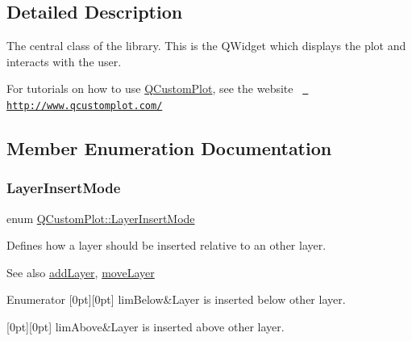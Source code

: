 \subsection{Detailed Description}
The central class of the library. This is the Q\+Widget which displays the plot and interacts with the user. 

For tutorials on how to use \mbox{\hyperlink{class_q_custom_plot}{Q\+Custom\+Plot}}, see the website~\newline
\href{http://www.qcustomplot.com/}{\texttt{ http\+://www.\+qcustomplot.\+com/}} 

\subsection{Member Enumeration Documentation}
\mbox{\label{class_q_custom_plot_a75a8afbe6ef333b1f3d47abb25b9add7}} 
\subsubsection{\texorpdfstring{LayerInsertMode}{LayerInsertMode}}
{\footnotesize\ttfamily enum \mbox{\hyperlink{class_q_custom_plot_a75a8afbe6ef333b1f3d47abb25b9add7}{Q\+Custom\+Plot\+::\+Layer\+Insert\+Mode}}}

Defines how a layer should be inserted relative to an other layer.

\begin{DoxySeeAlso}{See also}
\mbox{\hyperlink{class_q_custom_plot_ad5255393df078448bb6ac83fa5db5f52}{add\+Layer}}, \mbox{\hyperlink{class_q_custom_plot_ae896140beff19424e9e9e02d6e331104}{move\+Layer}} 
\end{DoxySeeAlso}
\begin{DoxyEnumFields}{Enumerator}
[0pt][0pt]{}\mbox{\label{class_q_custom_plot_a75a8afbe6ef333b1f3d47abb25b9add7aee39cf650cd24e68552da0b697ce4a93}} 
lim\+Below&Layer is inserted below other layer. \\
\hline

[0pt][0pt]{}\mbox{\label{class_q_custom_plot_a75a8afbe6ef333b1f3d47abb25b9add7a062b0b7825650b432a713c0df6742d41}} 
lim\+Above&Layer is inserted above other layer. \\
\hline

\end{DoxyEnumFields}
\mbox{\label{class_q_custom_plot_a45d61392d13042e712a956d27762aa39}} 
